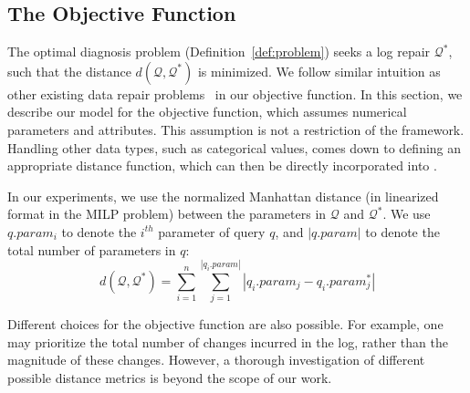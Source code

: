 
\subsection{The Objective Function}\label{sec:objfunction}

The optimal diagnosis problem (Definition~\ref{def:problem}) seeks a
log repair $\mathcal{Q}^*$, such that the distance
$d(\mathcal{Q},\mathcal{Q}^*)$ is minimized. We follow
similar intuition as other existing data repair problems~\cite{dallachiesa2013nadeef} in our objective function. In this section, we
describe our model for the objective function, which assumes numerical
parameters and attributes. This assumption is not a restriction of the
\sys framework.
Handling other data types, such as categorical values, comes down to defining an appropriate distance function, which can then be directly incorporated into \sys.

In our experiments, we use the normalized Manhattan
distance (in linearized format in the MILP problem) 
between the parameters in $\mathcal{Q}$ and
$\mathcal{Q}^*$. We use $q.param_i$ to denote the $i^{th}$ parameter
of query $q$, and $|q.param|$ to denote the total number of parameters
in $q$: 
% 
\[d(\mathcal{Q}, \mathcal{Q}^*) = \sum_{i = 1} ^{n} \sum_{j =
1}^{|q_i.param|} |q_i.param_j - q_i.param_j^*|\]
\vspace*{-0.1in}

Different choices for the objective function are also possible. For
example, one may prioritize the total number of changes incurred in
the log, rather than the magnitude of these changes. However, a
thorough investigation of different possible distance metrics is
beyond the scope of our work.


